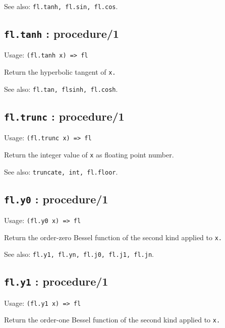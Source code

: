 \documentclass[
]{article}
\newcommand{\passthrough}[1]{#1}
\begin{document}
See also: \passthrough{\lstinline!fl.tanh, fl.sin, fl.cos!}.

\hypertarget{fl.tanh-procedure1-1}{%
\subsection{\texorpdfstring{\texttt{fl.tanh} :
procedure/1}{fl.tanh : procedure/1}}\label{fl.tanh-procedure1-1}}

Usage: \passthrough{\lstinline!(fl.tanh x) => fl!}

Return the hyperbolic tangent of \passthrough{\lstinline!x.!}

See also: \passthrough{\lstinline!fl.tan, flsinh, fl.cosh!}.

\hypertarget{fl.trunc-procedure1-1}{%
\subsection{\texorpdfstring{\texttt{fl.trunc} :
procedure/1}{fl.trunc : procedure/1}}\label{fl.trunc-procedure1-1}}

Usage: \passthrough{\lstinline!(fl.trunc x) => fl!}

Return the integer value of \passthrough{\lstinline!x!} as floating
point number.

See also: \passthrough{\lstinline!truncate, int, fl.floor!}.

\hypertarget{fl.y0-procedure1-1}{%
\subsection{\texorpdfstring{\texttt{fl.y0} :
procedure/1}{fl.y0 : procedure/1}}\label{fl.y0-procedure1-1}}

Usage: \passthrough{\lstinline!(fl.y0 x) => fl!}

Return the order-zero Bessel function of the second kind applied to
\passthrough{\lstinline!x.!}

See also: \passthrough{\lstinline!fl.y1, fl.yn, fl.j0, fl.j1, fl.jn!}.

\hypertarget{fl.y1-procedure1-1}{%
\subsection{\texorpdfstring{\texttt{fl.y1} :
procedure/1}{fl.y1 : procedure/1}}\label{fl.y1-procedure1-1}}

Usage: \passthrough{\lstinline!(fl.y1 x) => fl!}

Return the order-one Bessel function of the second kind applied to
\passthrough{\lstinline!x.!}
\end{document}
